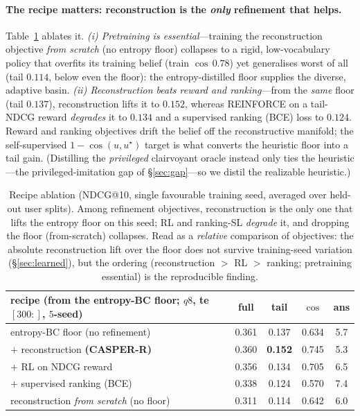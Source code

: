\documentclass[11pt]{article}
\begin{document}
\paragraph{The recipe matters: reconstruction is the \emph{only} refinement that helps.} Table~\ref{tab:ablation}
ablates it. \emph{(i) Pretraining is essential}---training the reconstruction objective \emph{from scratch} (no entropy
floor) collapses to a rigid, low-vocabulary policy that overfits its training belief (train $\cos\,0.78$) yet generalises
worst of all (tail $0.114$, below even the floor): the entropy-distilled floor supplies the diverse, adaptive basin.
\emph{(ii) Reconstruction beats reward and ranking}---from the \emph{same} floor (tail $0.137$), reconstruction lifts it
to $\mathbf{0.152}$, whereas REINFORCE on a tail-NDCG reward \emph{degrades} it to $0.134$ and a supervised ranking
(BCE) loss to $0.124$. Reward and ranking objectives drift the belief off the reconstructive manifold; the
self-supervised $1-\cos(u,u^\star)$ target is what converts the heuristic floor into a tail gain. (Distilling the
\emph{privileged} clairvoyant oracle instead only ties the heuristic---the privileged-imitation gap of \S\ref{sec:gap}---so
we distil the realizable heuristic.)

\begin{table}[h]\centering\small
\begin{tabular}{l cc c c}
\toprule
recipe (from the entropy-BC floor; $q8$, te$[300{:}]$, $5$-seed) & full & tail & $\cos$ & ans\\
\midrule
entropy-BC floor (no refinement) & 0.361 & 0.137 & 0.634 & 5.7\\
\quad $+$ reconstruction \textbf{(CASPER-R)} & 0.360 & \textbf{0.152} & 0.745 & 5.3\\
\quad $+$ RL on NDCG reward & 0.356 & 0.134 & 0.705 & 6.5\\
\quad $+$ supervised ranking (BCE) & 0.338 & 0.124 & 0.570 & 7.4\\
reconstruction \emph{from scratch} (no floor) & 0.311 & 0.114 & 0.642 & 6.0\\
\bottomrule
\end{tabular}
\caption{Recipe ablation (NDCG@10, single favourable training seed, averaged over held-out user splits). Among refinement
objectives, reconstruction is the only one that lifts the entropy floor on this seed; RL and ranking-SL \emph{degrade}
it, and dropping the floor (from-scratch) collapses. Read as a \emph{relative} comparison of objectives: the absolute
reconstruction lift over the floor does not survive training-seed variation (\S\ref{sec:learned}), but the ordering
(reconstruction $>$ RL $>$ ranking; pretraining essential) is the reproducible finding.}
\label{tab:ablation}
\end{table}
\end{document}

